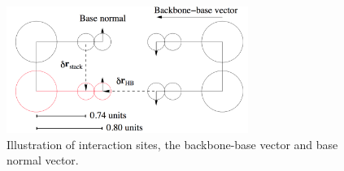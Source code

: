 \documentclass[12pt,onecolumn]{article}
\begin{document}
\begin{figure}[htpb]
\begin{center}
\includegraphics[width=0.7\textwidth]{./pics/model_diag-small.png}
\caption{\label{model_diag-small} Illustration of interaction sites, the backbone-base vector and base normal vector.}
\end{center}
\end{figure}
\end{document}

